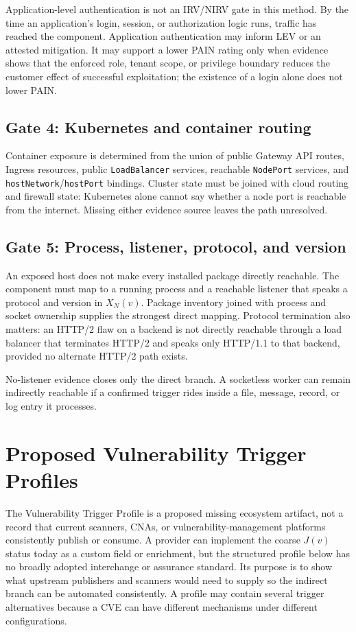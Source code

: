 \documentclass[11pt]{article}
\newcommand{\code}[1]{\texttt{#1}}
\begin{document}
Application-level authentication is not an IRV/NIRV gate in this method. By
the time an application's login, session, or authorization logic runs, traffic
has reached the component. Application authentication may inform LEV or an
attested mitigation. It may support a lower PAIN rating only when evidence
shows that the enforced role, tenant scope, or privilege boundary reduces the
customer effect of successful exploitation; the existence of a login alone
does not lower PAIN.

\subsection{Gate 4: Kubernetes and container routing}
Container exposure is determined from the union of public Gateway API routes,
Ingress resources, public \code{LoadBalancer} services, reachable
\code{NodePort} services, and \code{hostNetwork}/\code{hostPort} bindings.
Cluster state must be joined with cloud routing and firewall state: Kubernetes
alone cannot say whether a node port is reachable from the internet. Missing
either evidence source leaves the path unresolved.

\subsection{Gate 5: Process, listener, protocol, and version}
An exposed host does not make every installed package directly reachable. The
component must map to a running process and a reachable listener that speaks a
protocol and version in $X_N(v)$. Package inventory joined with process and
socket ownership supplies the strongest direct mapping. Protocol termination
also matters: an HTTP/2 flaw on a backend is not directly reachable through a
load balancer that terminates HTTP/2 and speaks only HTTP/1.1 to that backend,
provided no alternate HTTP/2 path exists.

No-listener evidence closes only the direct branch. A socketless worker can
remain indirectly reachable if a confirmed trigger rides inside a file,
message, record, or log entry it processes.

\section{Proposed Vulnerability Trigger Profiles}
\label{sec:trigger-profile}
The Vulnerability Trigger Profile is a proposed missing ecosystem artifact, not
a record that current scanners, CNAs, or vulnerability-management platforms
consistently publish or consume. A provider can implement the coarse $J(v)$
status today as a custom field or enrichment, but the structured profile below
has no broadly adopted interchange or assurance standard. Its purpose is to
show what upstream publishers and scanners would need to supply so the indirect
branch can be automated consistently. A profile may contain several trigger
alternatives because a CVE can have different mechanisms under different
configurations.
\end{document}

